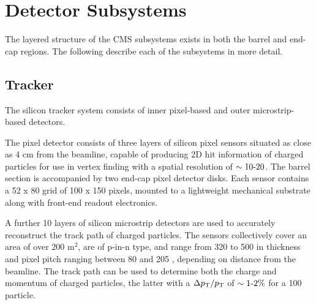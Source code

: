\section{Detector Subsystems}  %
\label{sec:detector_subsystems}

The layered structure of the CMS subsystems exists in both the barrel and
end-cap regions. The following describe each of the subsystems in more detail.

\subsection{Tracker}



The silicon tracker system consists of inner pixel-based and outer microstrip-
based detectors.

The pixel detector consists of three layers of silicon pixel sensors situated 
as close as 4 cm from the beamline, capable 
of producing 2D hit information of charged particles for use in vertex 
finding with a spatial resolution of $\sim 10 {\hbox{-}} 20$\microm. The barrel section
is accompanied by two end-cap pixel detector
disks. Each sensor contains a 52 x 80 grid of 100 \microm x 150 \microm pixels, 
mounted to a lightweight mechanical substrate along with front-end readout 
electronics.

A further 10 layers of silicon microstrip detectors are used to accurately 
reconstruct the track path of charged particles. The sensors collectively cover 
an area of over 200 $\text{m}^2$, are of p-in-n type, and range from 320 \microm
to 500 \microm in thickness and pixel pitch ranging between 80 \microm and 
205 \microm, depending on distance from the beamline. The track path can be used
to determine both the charge and momentum of charged particles, the latter with
a $\Delta {p_{\text T}}/{p_{\text T}}$ of $\sim 1 {\hbox{-}} 2 \%$ for a 100 \gev
particle.

